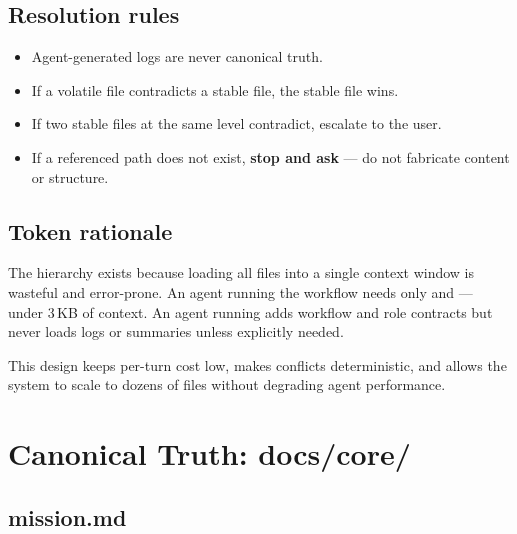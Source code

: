 \documentclass[a4paper,11pt,openany]{report}
\begin{document}
\section{Resolution rules}

\begin{itemize}
  \item Agent-generated logs are never canonical truth.
  \item If a volatile file contradicts a stable file, the stable file wins.
  \item If two stable files at the same level contradict, escalate to the user.
  \item If a referenced path does not exist, \textbf{stop and ask} --- do not
    fabricate content or structure.
\end{itemize}

\section{Token rationale}

The hierarchy exists because loading all files into a single context window is
wasteful and error-prone. An agent running the  workflow needs
only  and  --- under 3\,KB of
context. An agent running  adds workflow and role contracts
but never loads logs or summaries unless explicitly needed.

This design keeps per-turn cost low, makes conflicts deterministic, and allows
the system to scale to dozens of files without degrading agent performance.



\chapter{Canonical Truth: docs/core/}
\label{ch:core}


\section{mission.md}
\end{document}
